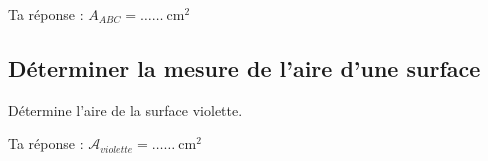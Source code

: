 Ta réponse : $ {A}_{ABC}=\ldots\ldots ~ \text{cm}^2$

 
 
 
 
 
 
 

\subsection{ Déterminer la mesure de l’aire d’une surface}




\begin{minipage}{0.7\linewidth}

Détermine l'aire de la surface violette.


Ta réponse : $\mathcal{A}_{violette}=\ldots\ldots ~ \text{cm}^2$

\end{minipage}
